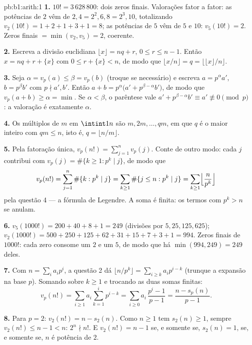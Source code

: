 \begin{solution}{pb:b1:arith:1}
\textbf{1.} $10! = 3\,628\,800$: dois zeros finais. Valorações
fator a fator: as potências de $2$ vêm de $2, 4 = 2^2, 6, 8 = 2^3,
10$, totalizando $v_2(10!) = 1 + 2 + 1 + 3 + 1 = 8$; as potências de $5$
vêm de $5$ e $10$: $v_5(10!) = 2$. Zeros finais $=
\min(v_2, v_5) = 2$, coerente.

\textbf{2.} Escreva a divisão euclidiana $\lfloor x\rfloor = nq +
r$, $0 \leq r \leq n - 1$. Então $x = nq + r + \{x\}$ com $0 \leq
r + \{x\} < n$, de modo que $\lfloor x/n \rfloor = q = \bigl\lfloor \lfloor
x \rfloor / n \bigr\rfloor$.

\textbf{3.} Seja $\alpha = v_p(a) \leq \beta = v_p(b)$ (troque se
necessário) e escreva $a = p^\alpha a'$, $b = p^\beta b'$ com $p
\nmid a', b'$. Então $a + b = p^\alpha\bigl(a' + p^{\beta -
\alpha}b'\bigr)$, de modo que $v_p(a + b) \geq \alpha = \min$. Se $\alpha <
\beta$, o parêntese vale $a' + p^{\beta-\alpha}b' \equiv a'
\not\equiv 0 \pmod p$: a valoração é exatamente $\alpha$.

\textbf{4.} Os múltiplos de $m$ em $\intint1n$ são $m, 2m, \dots,
qm$, em que $q$ é o maior inteiro com $qm \leq n$, isto é, $q =
\lfloor n/m \rfloor$.

\textbf{5.} Pela fatoração única, $v_p(n!) = \sum_{j=1}^{n}
v_p(j)$. Conte de outro modo: cada $j$ contribui com $v_p(j) =
\#\{k \geq 1 : p^k \mid j\}$, de modo que
\[
v_p(n!) = \sum_{j=1}^n \#\{k : p^k \mid j\}
= \sum_{k\geq1} \#\{j \leq n : p^k \mid j\}
= \sum_{k\geq1} \Bigl\lfloor \frac n{p^k} \Bigr\rfloor
\]
pela questão 4 --- a fórmula de Legendre. A soma é finita: os termos
com $p^k > n$ se anulam.

\textbf{6.} $v_5(1000!) = 200 + 40 + 8 + 1 = 249$ (divisões por
$5, 25, 125, 625$); $v_2(1000!) = 500 + 250 + 125 + 62 + 31 + 15 +
7 + 3 + 1 = 994$. Zeros finais de $1000!$: cada zero consome
um $2$ e um $5$, de modo que há $\min(994, 249) = 249$ deles.

\textbf{7.} Com $n = \sum_i a_ip^i$, a questão 2 dá $\lfloor
n/p^k \rfloor = \sum_{i \geq k} a_ip^{i-k}$ (trunque a expansão na base
$p$). Somando sobre $k \geq 1$ e trocando as duas somas finitas:
\[
v_p(n!) = \sum_{i\geq1} a_i \sum_{k=1}^{i} p^{i-k}
= \sum_{i\geq0} a_i\,\frac{p^i - 1}{p - 1}
= \frac{n - s_p(n)}{p - 1} .
\]

\textbf{8.} Para $p = 2$: $v_2(n!) = n - s_2(n)$. Como $n \geq 1$
tem $s_2(n) \geq 1$, sempre $v_2(n!) \leq n - 1 < n$: $2^n \nmid
n!$. E $v_2(n!) = n - 1$ se, e somente se, $s_2(n) = 1$, se, e somente se, $n$ é potência de
$2$.


\end{solution}
